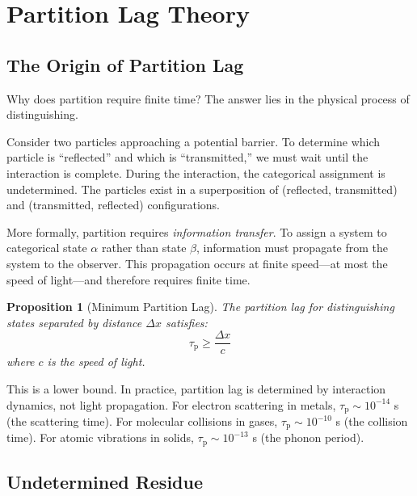 \documentclass[twocolumn,10pt,aps,prd,superscriptaddress,nofootinbib]{revtex4-2}
\newtheorem{proposition}[theorem]{Proposition}
\theoremstyle{remark}
\newcommand{\tauP}{\tau_{\mathrm{p}}}
\begin{document}

\section{Partition Lag Theory}
\label{sec:partition_lag}

\subsection{The Origin of Partition Lag}

Why does partition require finite time? The answer lies in the physical process of distinguishing.

Consider two particles approaching a potential barrier. To determine which particle is ``reflected'' and which is ``transmitted,'' we must wait until the interaction is complete. During the interaction, the categorical assignment is undetermined. The particles exist in a superposition of (reflected, transmitted) and (transmitted, reflected) configurations.

More formally, partition requires \emph{information transfer}. To assign a system to categorical state $\alpha$ rather than state $\beta$, information must propagate from the system to the observer. This propagation occurs at finite speed---at most the speed of light---and therefore requires finite time.

\begin{proposition}[Minimum Partition Lag]
\label{prop:minimum_lag}
The partition lag for distinguishing states separated by distance $\Delta x$ satisfies:
\begin{equation}
\tauP \geq \frac{\Delta x}{c}
\label{eq:minimum_lag}
\end{equation}
where $c$ is the speed of light.
\end{proposition}

This is a lower bound. In practice, partition lag is determined by interaction dynamics, not light propagation. For electron scattering in metals, $\tauP \sim 10^{-14}$ s (the scattering time). For molecular collisions in gases, $\tauP \sim 10^{-10}$ s (the collision time). For atomic vibrations in solids, $\tauP \sim 10^{-13}$ s (the phonon period).

\subsection{Undetermined Residue}
\end{document}
